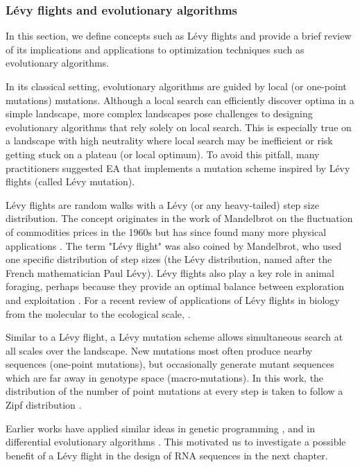 \subsubsection{Lévy flights and evolutionary algorithms}
In this section, we define concepts such as Lévy flights and provide a brief review of its implications and applications to optimization techniques such as evolutionary algorithms.

In its classical setting, evolutionary algorithms are guided by local (or one-point mutations) mutations. Although a local search can efficiently discover optima in a simple landscape, more complex landscapes pose challenges to designing evolutionary algorithms that rely solely on local search. This is especially true on a landscape with high neutrality where local search may be inefficient or risk getting stuck on a plateau (or local optimum). To avoid this pitfall, many practitioners suggested EA that implements a mutation scheme inspired by Lévy flights (called Lévy mutation).

Lévy flights are random walks with a Lévy (or any heavy-tailed) step size distribution. The concept originates in the work of Mandelbrot on the fluctuation of commodities prices in the 1960s \cite{mandelbrot1972certain} but has since found many more physical applications \cite{shlesinger1995levy}. The term "Lévy flight" was also coined by Mandelbrot, who used one specific distribution of step sizes (the Lévy distribution, named after the French mathematician Paul Lévy). Lévy flights also play a key role in animal foraging, perhaps because they provide an optimal balance between exploration and exploitation \cite{viswanathan2008levy,kamaruzaman2013levy}. For a recent review of applications of Lévy flights in biology from the molecular to the ecological scale, \cite{reynolds2018current}.

Similar to a Lévy flight, a Lévy mutation scheme allows simultaneous search at all scales over the landscape. New mutations most often produce nearby sequences (one-point mutations), but occasionally generate mutant sequences which are far away in genotype space (macro-mutations). In this work, the distribution of the number of point mutations at every step is taken to follow a Zipf distribution \cite{newman2005power}. 

Earlier works have applied similar ideas in genetic programming  \cite{LevyGP}, and in differential evolutionary algorithms \cite{sharma2015modified}. This motivated us to investigate a possible benefit of a Lévy flight in the design of RNA sequences in the next chapter.

